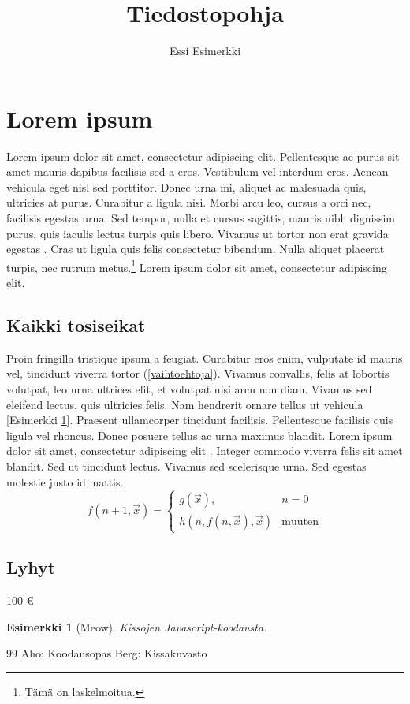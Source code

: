 \documentclass[a4paper,12pt,twoside]{article}
\begin{document}
\title{Tiedostopohja}
\author{Essi Esimerkki}
\maketitle
\tableofcontents
\newtheorem{esimerkki}{Esimerkki}
\section{Lorem ipsum}
Lorem ipsum dolor sit amet, consectetur adipiscing elit. Pellentesque ac purus sit amet mauris dapibus facilisis sed a eros. Vestibulum vel interdum eros. Aenean vehicula eget nisl sed porttitor. Donec urna mi, aliquet ac malesuada quis, ultricies at purus. Curabitur a ligula nisi. Morbi arcu leo, cursus a orci nec, facilisis egestas urna. Sed tempor, nulla et cursus sagittis, mauris nibh dignissim purus, quis iaculis lectus turpis quis libero. Vivamus ut tortor non erat gravida egestas \cite{Aho}. Cras ut ligula quis felis consectetur bibendum. Nulla aliquet placerat turpis, nec rutrum metus.\footnote{Tämä on laskelmoitua.} Lorem ipsum dolor sit amet, consectetur adipiscing elit.
\subsection{Kaikki tosiseikat}
Proin fringilla tristique ipsum a feugiat. Curabitur eros enim, vulputate id mauris vel, tincidunt viverra tortor (\ref{vaihtoehtoja}). Vivamus convallis, felis at lobortis volutpat, leo urna ultrices elit, et volutpat nisi arcu non diam. Vivamus sed eleifend lectus, quis ultricies felis. Nam hendrerit ornare tellus ut vehicula [Esimerkki \ref{meow}]. Praesent ullamcorper tincidunt facilisis. Pellentesque facilisis quis ligula vel rhoncus. Donec posuere tellus ac urna maximus blandit. Lorem ipsum dolor sit amet, consectetur adipiscing elit \cite{Ber}. Integer commodo viverra felis sit amet blandit. Sed ut tincidunt lectus. Vivamus sed scelerisque urna. Sed egestas molestie justo id mattis.
\begin{equation}
\label{vaihtoehtoja}
f(n+1,\vec{x})=
\left\{
\begin{array}{cl}
g(\vec{x}), & n=0 \\
h\left(n,f(n,\vec{x}),\vec{x}\right) & \textrm{muuten}
\end{array}
\right.
\end{equation}
\subsection{Lyhyt}
100 \euro
\begin{esimerkki}[Meow]
\label{meow}
Kissojen Javascript-koodausta.
\end{esimerkki}
\begin{thebibliography}{99}
 Aho: Koodausopas
 Berg: Kissakuvasto
\end{thebibliography}
\end{document}
